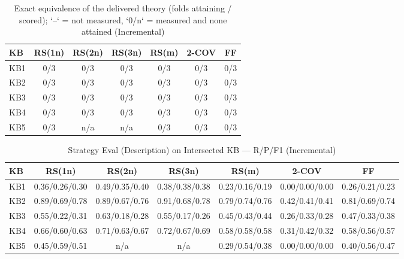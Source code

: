 \begin{table}[htbp]
\centering
\caption{Exact equivalence of the delivered theory (folds attaining / scored); `--` = not measured, `0/n` = measured and none attained (Incremental)}
\label{tab:exact_equiv_incremental}
\begin{tabular}{lcccccc}
\toprule
KB & RS(1n) & RS(2n) & RS(3n) & RS(m) & 2-COV & FF \\
\midrule
KB1 & 0/3 & 0/3 & 0/3 & 0/3 & 0/3 & 0/3 \\
KB2 & 0/3 & 0/3 & 0/3 & 0/3 & 0/3 & 0/3 \\
KB3 & 0/3 & 0/3 & 0/3 & 0/3 & 0/3 & 0/3 \\
KB4 & 0/3 & 0/3 & 0/3 & 0/3 & 0/3 & 0/3 \\
KB5 & 0/3 & n/a & n/a & 0/3 & 0/3 & 0/3 \\
\bottomrule
\end{tabular}
\end{table}

\begin{table}[htbp]
\centering
\caption{Strategy Eval (Description) on Intersected KB — R/P/F1 (Incremental)}
\label{tab:eval_description_incremental}
\begin{tabular}{lcccccc}
\toprule
KB & RS(1n) & RS(2n) & RS(3n) & RS(m) & 2-COV & FF \\
\midrule
KB1 & 0.36/0.26/0.30 & 0.49/0.35/0.40 & 0.38/0.38/0.38 & 0.23/0.16/0.19 & 0.00/0.00/0.00 & 0.26/0.21/0.23 \\
KB2 & 0.89/0.69/0.78 & 0.89/0.67/0.76 & 0.91/0.68/0.78 & 0.79/0.74/0.76 & 0.42/0.41/0.41 & 0.81/0.69/0.74 \\
KB3 & 0.55/0.22/0.31 & 0.63/0.18/0.28 & 0.55/0.17/0.26 & 0.45/0.43/0.44 & 0.26/0.33/0.28 & 0.47/0.33/0.38 \\
KB4 & 0.66/0.60/0.63 & 0.71/0.63/0.67 & 0.72/0.67/0.69 & 0.58/0.58/0.58 & 0.31/0.42/0.32 & 0.58/0.56/0.57 \\
KB5 & 0.45/0.59/0.51 & n/a & n/a & 0.29/0.54/0.38 & 0.00/0.00/0.00 & 0.40/0.56/0.47 \\
\bottomrule
\end{tabular}
\end{table}

